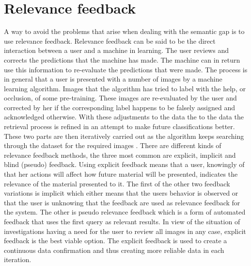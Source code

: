 \section{Relevance feedback}
\label{sec:theory:relfeed}
A way to avoid the problems that arise when dealing with the semantic gap is to use relevance feedback. 
Relevance feedback can be said to be the direct interaction between a user and a machine in learning. 
The user reviews and corrects the predictions that the machine has made. The machine can in return use this information to re-evaluate the predictions that were made.
The process is in general that a user is presented with a number of images by a machine learning algorithm. Images that the algorithm has tried to label with the help, or occlusion, of some pre-training. These images are re-evaluated by the user and corrected by her if the corresponding label happens to be falsely assigned and acknowledged otherwise. With these adjustments to the data the to the data the retrieval process is refined in an attempt to make future classifications better. These two parts are then iteratively carried out as the algorithm keeps searching through the dataset for the required images \cite{IRJET2017relevancefeedback}. There are different kinds of relevance feedback methods, the three most common are explicit, implicit and blind (pseudo) feedback. Using explicit feedback means that a user, knowingly of that her actions will affect how future material will be presented, indicates the relevance of the material presented to it. The first of the other two feedback variations is implicit which either means that the users behavior is observed or that the user is unknowing that the feedback are used as relevance feedback for the system. The other is pseudo relevance feedback which is a form of automated feedback that uses the first query as relevant results. In view of the situation of investigations having a need for the user to review all images in any case, explicit feedback is the best viable option. The explicit feedback is used to create a continuous data confirmation and thus creating more reliable data in each iteration.


